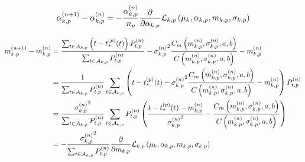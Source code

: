 \begin{equation}
    \alpha_{k,p}^{(n+1)} - \alpha_{k,p}^{(n)} = -\frac{\alpha_{k,p}^{(n)}}{n_p} \frac{\partial^{}}{\partial {\alpha_{k,p}}^{}}\mathcal{L}_{k,p}\left( \mu_k, \alpha_{k,p}, m_{k,p}, \sigma_{k,p} \right)
\end{equation}

\begin{equation}
    \begin{split}
        m_{k,p}^{(n+1)} - m_{k,p}^{(n)} &=\frac{\sum_{t\in\mathcal{A}_{k,p}} \left( t - t_*^{(p)}(t) \right) P_{t,p}^{(n)}}{\sum_{t\in\mathcal{A}_{k,p}} P_{t,p}^{(n)}} - {\sigma_{k,p}^{(n)}}^2 \frac{C_m\left( m_{k,p}^{(n)}, \sigma_{k,p}^{(n)},a,b \right)}{C\left( m_{k,p}^{(n)}, \sigma_{k,p}^{(n)},a,b \right)} - m_{k,p}^{(n)} \\
        &= \frac{1}{\sum_{t\in\mathcal{A}_{k,p}} P_{t,p}^{(n)}}\sum_{t\in\mathcal{A}_{k,p}} \left( t - t_*^{(p)}(t) - {\sigma_{k,p}^{(n)}}^2 \frac{C_m\left( m_{k,p}^{(n)}, \sigma_{k,p}^{(n)},a,b \right)}{C\left( m_{k,p}^{(n)}, \sigma_{k,p}^{(n)},a,b \right)} - m_{k,p}^{(n)} \right) P_{t,p}^{(n)} \\
        &= \frac{{\sigma_{k,p}^{(n)}}^2}{\sum_{t\in\mathcal{A}_{k,p}} P_{t,p}^{(n)}} \sum_{t\in\mathcal{A}_{k,p}} P_{t,p}^{(n)} \left( \frac{t - t_*^{(p)}(t) - m_{k,p}^{(n)}}{{\sigma_{k,p}^{(n)}}^2} - \frac{C_m\left( m_{k,p}^{(n)}, \sigma_{k,p}^{(n)},a,b \right)}{C\left( m_{k,p}^{(n)}, \sigma_{k,p}^{(n)},a,b \right)} \right) \\
        &= - \frac{{\sigma_{k,p}^{(n)}}^2}{\sum_{t\in\mathcal{A}_{k,p}} P_{t,p}^{(n)}} \frac{\partial^{}}{\partial {m_{k,p}}^{}}\mathcal{L}_{k,p}\left( \mu_k, \alpha_{k,p}, m_{k,p}, \sigma_{k,p} \right)
    \end{split}
\end{equation}
